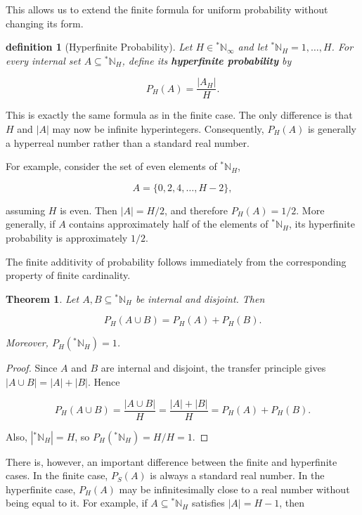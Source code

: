 \documentclass[10pt,a4paper]{book}
\newtheorem{definition}{definition}[section]
\newtheorem{theorem}{Theorem}[section]
\begin{document}
This allows us to extend the finite formula for uniform probability without changing its form.

\begin{definition}[Hyperfinite Probability]
    Let $H\in {}^*\mathbb{N}_\infty $ and let ${}^*\mathbb{N}_H={1,\ldots,H}$. For every internal set $A\subseteq {}^*\mathbb{N}_H$, define its \textbf{hyperfinite probability} by

    $$
        P_H(A)=\frac{|A_H|}{H}.
    $$

\end{definition}

This is exactly the same formula as in the finite case. The only difference is that $H$ and $|A|$ may now be infinite hyperintegers. Consequently, $P_H(A)$ is generally a hyperreal number rather than a standard real number.

For example, consider the set of even elements of ${}^*\mathbb{N}_H$,

$$
    A=\{0,2,4,\ldots,H-2\},
$$

assuming $H$ is even. Then $|A|=H/2$, and therefore $P_H(A)=1/2$. More generally, if $A$ contains approximately half of the elements of ${}^*\mathbb{N}_H$, its hyperfinite probability is approximately $1/2$.

The finite additivity of probability follows immediately from the corresponding property of finite cardinality.

\begin{theorem}
    Let $A,B\subseteq {}^*\mathbb{N}_H$ be internal and disjoint. Then

    $$
        P_H(A\cup B)=P_H(A)+P_H(B).
    $$

    Moreover, $P_H({}^*\mathbb{N}_H)=1$.
\end{theorem}

\begin{proof}
    Since $A$ and $B$ are internal and disjoint, the transfer principle gives $|A\cup B|=|A|+|B|$. Hence

    $$
        P_H(A\cup B)
        =\frac{|A\cup B|}{H}
        =\frac{|A|+|B|}{H}
        =P_H(A)+P_H(B).
    $$

    Also, $|{}^*\mathbb{N}_H|=H$, so $P_H({}^*\mathbb{N}_H)=H/H=1$.
\end{proof}

There is, however, an important difference between the finite and hyperfinite cases. In the finite case, $P_S(A)$ is always a standard real number. In the hyperfinite case, $P_H(A)$ may be infinitesimally close to a real number without being equal to it. For example, if $A\subseteq {}^*\mathbb{N}_H$ satisfies $|A|=H-1$, then
\end{document}
